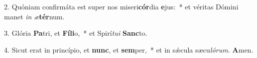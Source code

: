 2. Quóniam confirmáta est super nos miseri\textbf{cór}dia \textbf{e}jus:~*  et véritas Dómini manet \textit{in} \textit{æ}\textbf{tér}num.\

3. Glória \textbf{Pa}tri, et \textbf{Fí}\textbf{li}o,~*  et Spirí\textit{tu}\textit{i} \textbf{Sanc}to.\

4. Sicut erat in princípio, et \textbf{nunc}, et \textbf{sem}per,~*  et in sǽcula sæcu\textit{ló}\textit{rum}. \textbf{A}men.\

